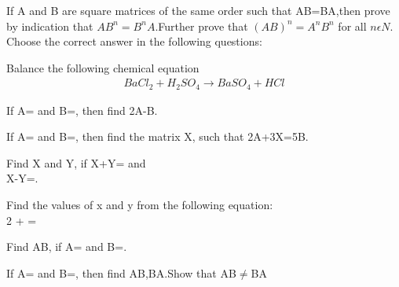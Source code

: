   \item If A and B are square matrices of the same order such that AB=BA,then prove by indication that $AB^{n}=B^{n}A$.Further prove that $(AB)^{n}=A^{n}B^{n}$ for all $n \epsilon N$.\\
  Choose the correct answer in the following questions:\\

\item Balance the following chemical equation
\begin{align}\label{1}
    BaCl_2 + H_2SO_4 \xrightarrow{} BaSO_4 + HCl
\end{align}
    \item If A= and B=, then find 2A-B.\\
    \item If A= and B=, then find the matrix X, such that 2A+3X=5B.\\
    \item Find X and Y, if X+Y= and \\X-Y=.\\
    \item Find the values of x and y from the following equation:\\
    2 +  = \\
     
    

   
    \item  Find AB, if A= and B=.\\
    \item  If A= and B=, then find AB,BA.Show that AB$\neq$BA

